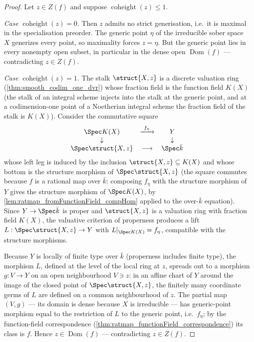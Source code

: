 \begin{proof}
  \leanok
  Let \(z \in Z(f)\) and suppose \(\operatorname{coheight}(z) \leq 1\).

  \emph{Case \(\operatorname{coheight}(z) = 0\).} Then \(z\) admits no strict
  generisation, i.e.\ it is maximal in the specialisation preorder. The generic
  point \(\eta\) of the irreducible sober space \(X\) generizes every point, so
  maximality forces \(z = \eta\). But the generic point lies in every nonempty
  open subset, in particular in the dense open \(\operatorname{Dom}(f)\) ---
  contradicting \(z \in Z(f)\).

  \emph{Case \(\operatorname{coheight}(z) = 1\).} The stalk
  \(\struct{X,z}\) is a discrete valuation ring
  (\ref{thm:smooth_codim_one_dvr}) whose fraction field is the function field
  \(K(X)\) (the stalk of an integral scheme injects into the stalk at the
  generic point, and at a codimension-one point of a Noetherian integral scheme
  the fraction field of the stalk is \(K(X)\)). Consider the commutative
  square
  \[
    \begin{array}{ccc}
      \Spec K(X) & \xrightarrow{\ f_\eta\ } & Y \\
      \downarrow & & \downarrow \\
      \Spec \struct{X,z} & \longrightarrow & \Spec \bar k
    \end{array}
  \]
  whose left leg is induced by the inclusion \(\struct{X,z} \subseteq K(X)\)
  and whose bottom is the structure morphism of \(\Spec \struct{X,z}\) (the
  square commutes because \(f\) is a rational map over \(\bar k\): composing
  \(f_\eta\) with the structure morphism of \(Y\) gives the structure morphism
  of \(\Spec K(X)\), by \ref{lem:ratmap_fromFunctionField_compHom} applied to
  the over-\(\bar k\) equation). Since \(Y \to \Spec \bar k\) is proper and
  \(\struct{X,z}\) is a valuation ring with fraction field \(K(X)\), the
  valuative criterion of properness produces a lift
  \(L : \Spec \struct{X,z} \to Y\) with
  \(L|_{\Spec K(X)} = f_\eta\), compatible with the structure morphisms.

  Because \(Y\) is locally of finite type over \(\bar k\) (properness includes
  finite type), the morphism \(L\), defined at the level of the local ring at
  \(z\), spreads out to a morphism \(g : V \to Y\) on an open neighbourhood
  \(V \ni z\): in an affine chart of \(Y\) around the image of the closed point
  of \(\Spec \struct{X,z}\), the finitely many coordinate germs of \(L\) are
  defined on a common neighbourhood of \(z\). The partial map \((V, g)\) --- its
  domain is dense because \(X\) is irreducible --- has generic-point morphism
  equal to the restriction of \(L\) to the generic point, i.e.\ \(f_\eta\); by
  the function-field correspondence
  (\ref{thm:ratmap_functionField_correspondence}) its class is \(f\). Hence
  \(z \in \operatorname{Dom}(f)\) --- contradicting \(z \in Z(f)\).
\end{proof}

